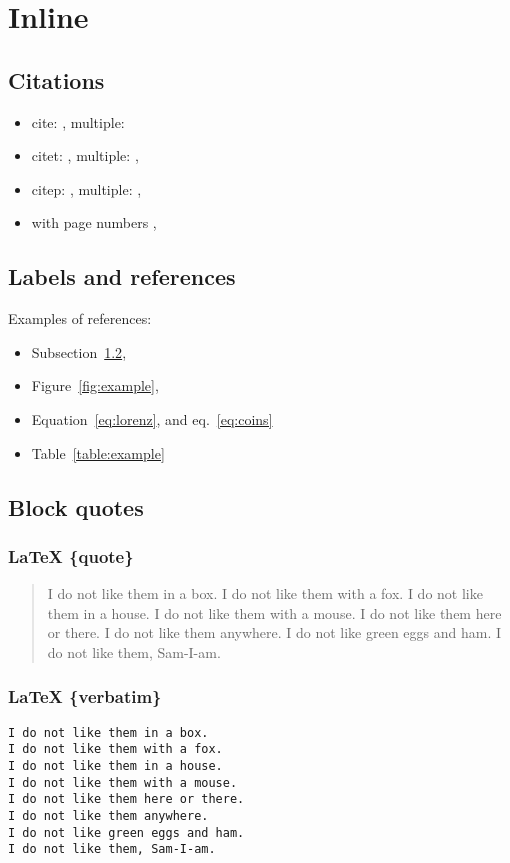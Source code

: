 \section{Inline}
\subsection{Citations}
\begin{itemize} 
\item cite: \cite{2016}, multiple: \cite{2016,Einstein_1922}
\item citet: \citet{2016}, multiple: \citet{2016,Einstein_1922},
\item citep: \citep{2016}, multiple: \citep{2016,Einstein_1922}, 
\item with page numbers \cite[pp.~2]{2016}, \cite[pp.~12-22]{Einstein_1922}
\end{itemize}

\subsection{Labels and references}\label{sec:labels}
Examples of references: 
\begin{itemize}
\item Subsection~\ref{sec:labels},
\item Figure~\ref{fig:example},
\item Equation~\ref{eq:lorenz}, and eq.~\ref{eq:coins}
\item Table~\ref{table:example}
\end{itemize}

\subsection{Block quotes}
\subsubsection{{\LaTeX} \{quote\}}
\begin{quote}
I do not like them in a box.
I do not like them with a fox.
I do not like them in a house.
I do not like them with a mouse.
I do not like them here or there.
I do not like them anywhere.
I do not like green eggs and ham.
I do not like them, Sam-I-am.
\end{quote}

\subsubsection{{\LaTeX} \{verbatim\}}
\begin{verbatim}
I do not like them in a box.
I do not like them with a fox.
I do not like them in a house.
I do not like them with a mouse.
I do not like them here or there.
I do not like them anywhere.
I do not like green eggs and ham.
I do not like them, Sam-I-am.
\end{verbatim}

